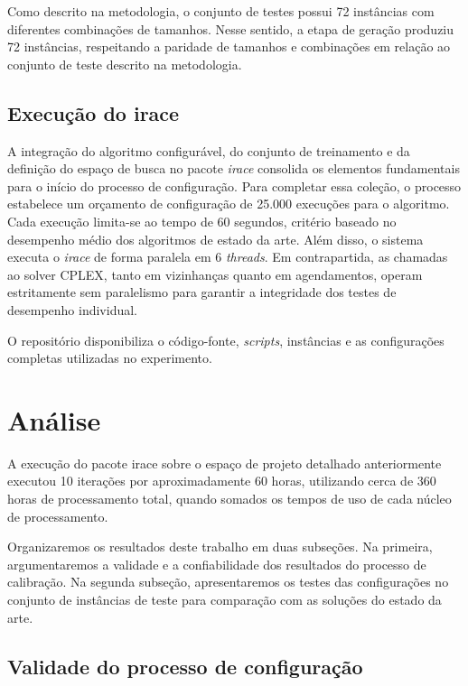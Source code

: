 Como descrito na metodologia, o conjunto de testes possui 72 instâncias com diferentes combinações de tamanhos. Nesse sentido, a etapa de geração produziu 72 instâncias, respeitando a paridade de tamanhos e combinações em relação ao conjunto de teste descrito na metodologia.

\subsection{Execução do irace}

A integração do algoritmo configurável, do conjunto de treinamento e da definição do espaço de busca no pacote \textit{irace} consolida os elementos fundamentais para o início do processo de configuração. Para completar essa coleção, o processo estabelece um orçamento de configuração de 25.000 execuções para o algoritmo. Cada execução limita-se ao tempo de 60 segundos, critério baseado no desempenho médio dos algoritmos de estado da arte. Além disso, o sistema executa o \textit{irace} de forma paralela em 6 \textit{threads}. Em contrapartida, as chamadas ao solver CPLEX, tanto em vizinhanças quanto em agendamentos, operam estritamente sem paralelismo para garantir a integridade dos testes de desempenho individual.

O repositório \cite{leles2026jitjss} disponibiliza o código-fonte, \textit{scripts}, instâncias e as configurações completas utilizadas no experimento.

\section{Análise} \label{sect:analise}

A execução do pacote irace sobre o espaço de projeto detalhado anteriormente executou 10 iterações por aproximadamente 60 horas, utilizando cerca de 360 horas de processamento total, quando somados os tempos de uso de cada núcleo de processamento.

Organizaremos os resultados deste trabalho em duas subseções. Na primeira, argumentaremos a validade e a confiabilidade dos resultados do processo de calibração. Na segunda subseção, apresentaremos os testes das configurações no conjunto de instâncias de teste para comparação com as soluções do estado da arte.

\subsection{Validade do processo de configuração}

